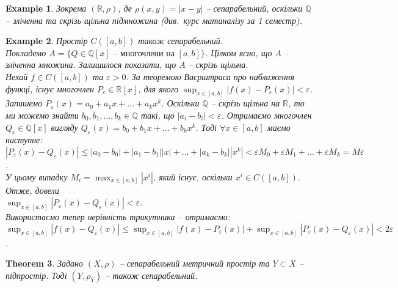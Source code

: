 \documentclass[a4paper, 10pt]{article}
\theoremstyle{theoremdd}
\newtheorem{theorem}{Theorem}[subsection]
\theoremstyle{theoremdd}
\theoremstyle{theoremdd}
\theoremstyle{theoremdd}
\newtheorem{example}[theorem]{Example}
\theoremstyle{theoremdd}
\theoremstyle{theoremdd}
\theoremstyle{theoremdd}
\theoremstyle{theoremdd}
\begin{document}
\begin{example}
Зокрема $(\mathbb{R}, \rho)$, де $\rho(x,y) = |x-y|$ -- сепарабельний, оскільки $\mathbb{Q}$ -- зліченна та скрізь щільна підмножина (див.\ курс матаналізу за 1 семестр).
\end{example}

\begin{example}
Простір $C([a,b])$ також сепарабельний.\\
Покладемо $A = \{ Q \in \mathbb{Q}[x] \text{ -- многочлени на $[a,b]$}\}$. Цілком ясно, що $A$ -- зліченна множина. Залишилося показати, що $A$ -- скрізь щільна.\\
Нехай $f \in C([a,b])$ та $\varepsilon > 0$. За теоремою Ваєрштраса про наближення функці, існує многочлен $P_\varepsilon \in \mathbb{R}[x]$, для якого $\displaystyle\sup_{x \in [a,b]} |f(x) - P_\varepsilon(x)| < \varepsilon$. Запишемо $P_\varepsilon(x) = a_0 + a_1 x + \dots + a_k x^k$. Оскільки $\mathbb{Q}$ -- скрізь щільна на $\mathbb{R}$, то ми можемо знайти $b_0,b_1,\dots,b_k \in \mathbb{Q}$ такі, що $|a_i-b_i| < \varepsilon$. Отримаємо многочлен $Q_\varepsilon \in \mathbb{Q}[x]$ вигляду $Q_\varepsilon(x) = b_0 + b_1 x + \dots + b_k x^k$. Тоді $\forall x \in [a,b]$ маємо наступне:\\
$|P_\varepsilon(x) - Q_\varepsilon(x)| \leq |a_0-b_0| + |a_1-b_1| |x| + \dots + |a_k - b_k| |x^k| < \varepsilon M_0 + \varepsilon M_1 + \dots + \varepsilon M_k = M \varepsilon$.\\
У цьому випадку $M_i = \displaystyle\max_{x \in [a,b]} |x^i|$, який існує, оскільки $x^i \in C([a,b])$. Отже, довели\\
$\displaystyle\sup_{x \in [a,b]} |P_\varepsilon(x) - Q_\varepsilon(x)| < \varepsilon$.\\
Використаємо тепер нерівність трикутника -- отримаємо:\\
$\displaystyle\sup_{x \in [a,b]} |f(x) - Q_\varepsilon(x)| \leq \sup_{x \in [a,b]} |f(x) - P_\varepsilon(x)| + \sup_{x \in [a,b]} |P_\varepsilon(x) - Q_\varepsilon(x)| < 2\varepsilon$.
\end{example}

\begin{theorem}
Задано $(X,\rho)$ -- сепарабельний метричний простір та $Y \subset X$ -- підпростір. Тоді $(Y,\rho_Y)$ -- також сепарабельний.
\end{theorem}
\end{document}
